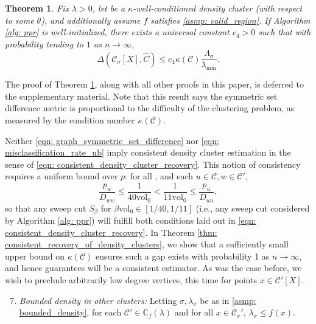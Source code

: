 \documentclass{article}
\newcommand{\vol}{\mathrm{vol}}
\newcommand{\1}{\mathbf{1}}
\newcommand{\pbf}{p}        %
\newcommand{\Xbf}{X}             %
\newcommand{\Dbf}{D}
\newcommand{\Cbb}{\mathbb{C}}
\newcommand{\Cset}{\mathcal{C}}
\newcommand{\Csig}{\Cset_{\sigma}}
\newcommand{\Cest}{\widehat{C}}
\theoremstyle{aldenthm}
\newtheorem{theorem}{Theorem}
\theoremstyle{aldenrmrk}
\begin{document}
\begin{theorem}
  \label{thm: misclassification_rate}
  Fix $\lambda > 0$, let \smash{$\Cset \in \Cbb_f(\lambda)$} be a
  $\kappa$-well-conditioned density cluster (with respect to some $\theta$), and
  additionally assume $f$ satisfies \ref{asmp: valid_region}. If Algorithm
  \ref{alg: ppr} is well-initialized, there exists a universal constant $c_4 >
  0$ such that with probability tending to $1$ as $n \to \infty$,  
  \begin{equation}
    \label{eqn: misclassification_rate_ub}
    \Delta(\Csig[\Xbf], \Cest) \leq c_4 \kappa(\Cset)
    \frac{\Lambda_{\sigma}}{\lambda_{\min}}. 
  \end{equation}
\end{theorem}

The proof of Theorem \ref{thm: misclassification_rate}, along with all other
proofs in this paper, is deferred to the supplementary material. Note that this 
result says the symmetric set difference metric \smash{$\Delta(\Csig[\Xbf],
  \Cest)$} is proportional to the difficulty of the clustering problem, as
measured by the condition number $\kappa(\Cset)$. 

Neither \eqref{eqn: graph_symmetric_set_difference} nor \eqref{eqn:
  misclassification_rate_ub} imply consistent density cluster estimation in the 
sense of \eqref{eqn: consistent_density_cluster_recovery}. This notion of
consistency requires a uniform bound over $\pbf$: for all \smash{$\Cset'
  \in \Cbb_f(\lambda), \Cset' \neq \Cset$}, and each $u \in \Cset, w \in
\Cset'$,  
\begin{equation}
\label{eqn: ppr_gap}
\frac{p_{w}}{\Dbf_{ww}} \leq \frac{1}{40\vol_0} < \frac{1}{11\vol_0} \leq
\frac{p_u}{\Dbf_{uu}}, 
\end{equation}
so that any sweep cut $S_{\beta}$ for $\beta \vol_0 \in [1/40,1/11]$ (i.e., any
sweep cut considered by Algorithm \ref{alg: ppr}) will fulfill both conditions
laid out in \eqref{eqn: consistent_density_cluster_recovery}. In Theorem
\ref{thm: consistent_recovery_of_density_clusters}, we show that a sufficiently
small upper bound on $\kappa(\Cset)$ ensures such a gap exists with probability
1 as $n \to \infty$, and hence guarantees \smash{$\Cest$} will be a consistent  
estimator. As was the case before, we wish to preclude arbitrarily low degree
vertices, this time for points $x \in \Cset'[\Xbf]$. 
\begin{enumerate}[label=(A\arabic*)]
  \setcounter{enumi}{6}
\item 
  \label{asmp: C'_bounded_density}
  \emph{Bounded density in other clusters:} Letting $\sigma,\lambda_{\sigma}$ be 
  as in \ref{asmp: bounded_density}, for each $\Cset' \in \Cbb_f(\lambda)$ and
  for all $x \in \Csig'$, $\lambda_{\sigma} \leq f(x)$. 
\end{enumerate}
\end{document}
